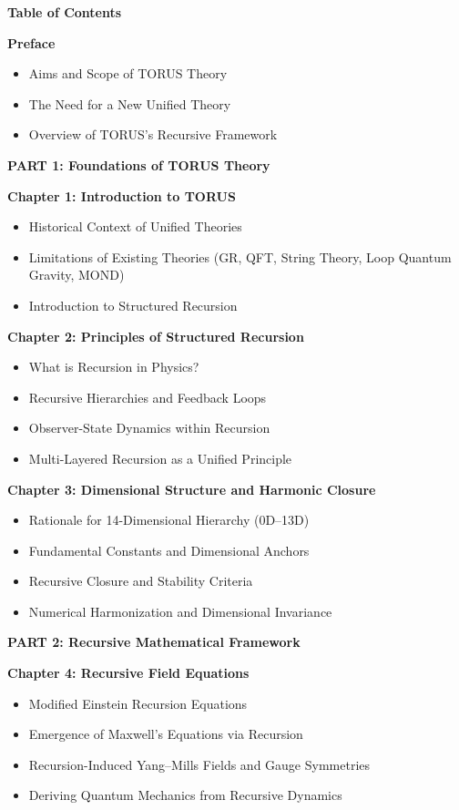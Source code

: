 \documentclass[]{article}
\date{}
\begin{document}
\textbf{Table of Contents}

\textbf{Preface}

\begin{itemize}
\item
  Aims and Scope of TORUS Theory
\item
  The Need for a New Unified Theory
\item
  Overview of TORUS's Recursive Framework
\end{itemize}

\textbf{PART 1: Foundations of TORUS Theory}

\textbf{Chapter 1: Introduction to TORUS}

\begin{itemize}
\item
  Historical Context of Unified Theories
\item
  Limitations of Existing Theories (GR, QFT, String Theory, Loop Quantum
  Gravity, MOND)
\item
  Introduction to Structured Recursion
\end{itemize}

\textbf{Chapter 2: Principles of Structured Recursion}

\begin{itemize}
\item
  What is Recursion in Physics?
\item
  Recursive Hierarchies and Feedback Loops
\item
  Observer-State Dynamics within Recursion
\item
  Multi-Layered Recursion as a Unified Principle
\end{itemize}

\textbf{Chapter 3: Dimensional Structure and Harmonic Closure}

\begin{itemize}
\item
  Rationale for 14-Dimensional Hierarchy (0D--13D)
\item
  Fundamental Constants and Dimensional Anchors
\item
  Recursive Closure and Stability Criteria
\item
  Numerical Harmonization and Dimensional Invariance
\end{itemize}

\textbf{PART 2: Recursive Mathematical Framework}

\textbf{Chapter 4: Recursive Field Equations}

\begin{itemize}
\item
  Modified Einstein Recursion Equations
\item
  Emergence of Maxwell's Equations via Recursion
\item
  Recursion-Induced Yang--Mills Fields and Gauge Symmetries
\item
  Deriving Quantum Mechanics from Recursive Dynamics
\end{itemize}
\end{document}
